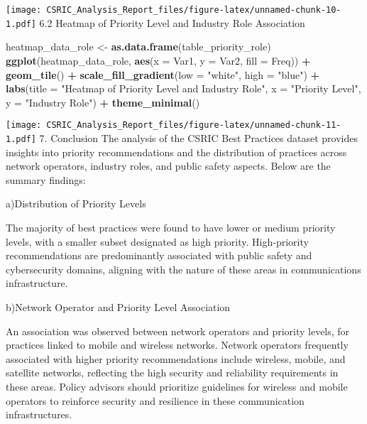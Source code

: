 \documentclass[
]{article}
\newenvironment{Shaded}{\begin{snugshade}}{\end{snugshade}}
\newcommand{\AttributeTok}[1]{\textcolor[rgb]{0.13,0.29,0.53}{#1}}
\newcommand{\FunctionTok}[1]{\textcolor[rgb]{0.13,0.29,0.53}{\textbf{#1}}}
\newcommand{\NormalTok}[1]{#1}
\newcommand{\OtherTok}[1]{\textcolor[rgb]{0.56,0.35,0.01}{#1}}
\newcommand{\SpecialCharTok}[1]{\textcolor[rgb]{0.81,0.36,0.00}{\textbf{#1}}}
\newcommand{\StringTok}[1]{\textcolor[rgb]{0.31,0.60,0.02}{#1}}
\begin{document}
\texttt{[image: CSRIC\_Analysis\_Report\_files/figure-latex/unnamed-chunk-10-1.pdf]}
6.2 Heatmap of Priority Level and Industry Role Association

\begin{Shaded}
\begin{Highlighting}[]
\NormalTok{heatmap\_data\_role }\OtherTok{\textless{}{-}} \FunctionTok{as.data.frame}\NormalTok{(table\_priority\_role)}
\FunctionTok{ggplot}\NormalTok{(heatmap\_data\_role, }\FunctionTok{aes}\NormalTok{(}\AttributeTok{x =}\NormalTok{ Var1, }\AttributeTok{y =}\NormalTok{ Var2, }\AttributeTok{fill =}\NormalTok{ Freq)) }\SpecialCharTok{+}
  \FunctionTok{geom\_tile}\NormalTok{() }\SpecialCharTok{+}
  \FunctionTok{scale\_fill\_gradient}\NormalTok{(}\AttributeTok{low =} \StringTok{"white"}\NormalTok{, }\AttributeTok{high =} \StringTok{"blue"}\NormalTok{) }\SpecialCharTok{+}
  \FunctionTok{labs}\NormalTok{(}\AttributeTok{title =} \StringTok{"Heatmap of Priority Level and Industry Role"}\NormalTok{, }\AttributeTok{x =} \StringTok{"Priority Level"}\NormalTok{, }\AttributeTok{y =} \StringTok{"Industry Role"}\NormalTok{) }\SpecialCharTok{+}
  \FunctionTok{theme\_minimal}\NormalTok{()}
\end{Highlighting}
\end{Shaded}

\texttt{[image: CSRIC\_Analysis\_Report\_files/figure-latex/unnamed-chunk-11-1.pdf]}
7. Conclusion The analysis of the CSRIC Best Practices dataset provides
insights into priority recommendations and the distribution of practices
across network operators, industry roles, and public safety aspects.
Below are the summary findings:

a)Distribution of Priority Levels

The majority of best practices were found to have lower or medium
priority levels, with a smaller subset designated as high priority.
High-priority recommendations are predominantly associated with public
safety and cybersecurity domains, aligning with the nature of these
areas in communications infrastructure.

b)Network Operator and Priority Level Association

An association was observed between network operators and priority
levels, for practices linked to mobile and wireless networks. Network
operators frequently associated with higher priority recommendations
include wireless, mobile, and satellite networks, reflecting the high
security and reliability requirements in these areas. Policy advisors
should prioritize guidelines for wireless and mobile operators to
reinforce security and resilience in these communication
infrastructures.
\end{document}
